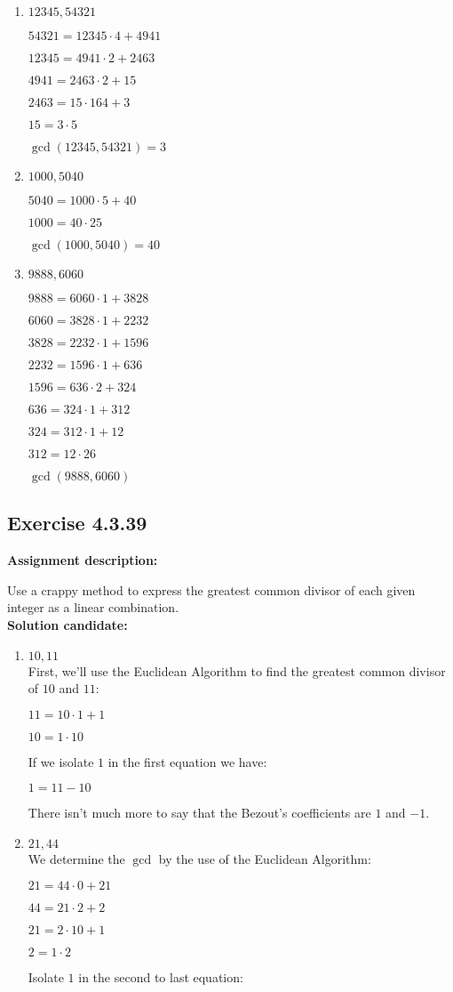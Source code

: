 \documentclass{report}
\newcommand{\cent}[1]{\begin{center}#1\end{center}}
\newcommand{\assignmentDescription}{\textbf{Assignment description: }}
\newcommand{\solution}{\textbf{Solution candidate: }}
\newcommand{\Exercise}[1]{\subsection{Exercise #1}}
\newcommand{\defaultEnumerateLabel}{\textbf{\alph*.}}
\newcommand{\myItem}[1]{\item #1\\}
\begin{document}
\begin{enumerate}[label=\defaultEnumerateLabel]
\begin{enumerate}[label=\defaultEnumerateLabel]
		\myItem{$12345, 54321$}
		
		\cent{$54321 = 12345 \cdot 4 + 4941$}
		\cent{$12345 = 4941 \cdot 2 + 2463$}
		\cent{$4941 = 2463 \cdot 2 + 15$}
		\cent{$2463 = 15 \cdot 164 + 3$}
		\cent{$15 = 3 \cdot 5$}
		
		\cent{$\gcd(12345,54321) = 3$}
		
		\myItem{$1000,5040$}
		
		\cent{$5040 = 1000 \cdot 5 + 40$}
		\cent{$1000 = 40 \cdot 25$}
		
		\cent{$\gcd(1000,5040) = 40$}
		
		\myItem{$9888, 6060$}
		
		\cent{$9888 = 6060 \cdot 1 + 3828$}
		\cent{$6060 = 3828 \cdot 1 + 2232$}
		\cent{$3828 =  2232 \cdot 1 + 1596$}
		\cent{$2232 =  1596 \cdot 1 + 636$}
		\cent{$1596  =  636 \cdot 2 + 324$}
		\cent{$636  =  324 \cdot 1 + 312$}
		\cent{$324   = 312 \cdot 1 + 12$}
		\cent{$312    = 12\cdot 26$}
		
		\cent{$\gcd(9888,6060)$}
		
	\end{enumerate}
	\Exercise{4.3.39}
	
	\assignmentDescription
	
	Use a crappy method to express the greatest common divisor of each given integer as a linear combination.\\
	
	\solution
	
	\begin{enumerate}[label=\defaultEnumerateLabel]
		\myItem{$10,11$}
		
		First, we'll use the Euclidean Algorithm to find the greatest common divisor of $10$ and $11$:
		
		\cent{$11 = 10 \cdot 1 + 1$}
		\cent{$10 = 1 \cdot 10$}
		
		
		If we isolate $1$ in the first equation we have:
		
		\cent{$1 = 11 - 10 $}
		
		There isn't much more to say that the Bezout's coefficients are $1$ and $-1$.\\
		
		\myItem{$21,44$}
		
		We determine the $\gcd$ by the use of the Euclidean Algorithm:
		
		\cent{$21 = 44\cdot 0 + 21$}
		\cent{$44 = 21 \cdot 2 + 2$}
		\cent{$21 = 2 \cdot 10 + 1$}
		\cent{$2 = 1 \cdot 2$}
		
		Isolate $1$ in the second to last equation:
		

\end{enumerate}
\end{enumerate}
\end{document}
